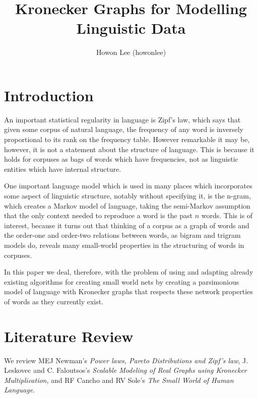 \documentclass[12pt]{article}
\begin{document}
\title{Kronecker Graphs for Modelling Linguistic Data}
\author{Howon Lee (howonlee)}
\maketitle

\section{Introduction}

An important statistical regularity in language is Zipf's law, which says that given some corpus of natural language, the frequency of any word is inversely proportional to its rank on the frequency table. However remarkable it may be, however, it is not a statement about the structure of language. This is because it holds for corpuses as bags of words which have frequencies, not as linguistic entities which have internal structure. %

One important language model which is used in many places which incorporates some aspect of linguistic structure, notably without specifying it, is the n-gram, which creates a Markov model of language, taking the semi-Markov assumption that the only context needed to reproduce a word is the past $n$ words. This is of interest, because it turns out that thinking of a corpus as a graph of words and the order-one and order-two relations between words, as bigram and trigram models do, reveals many small-world properties in the structuring of words in corpuses. %

In this paper we deal, therefore, with the problem of using and adapting already existing algorithms for creating small world nets by creating a parsimonious model of language with Kronecker graphs that respects these network properties of words as they currently exist.

\section{Literature Review}

We review MEJ Newman's \emph{Power laws, Pareto Distributions and Zipf's law}, J. Leskovec and C. Faloutsos's \emph{Scalable Modeling of Real Graphs using Kronecker Multiplication}, and RF Cancho and RV Sole's \emph{The Small World of Human Language}. %
\end{document}
